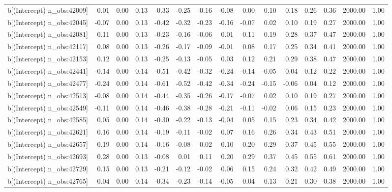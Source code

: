 \begin{table}[ht]
\begin{tabular}{rrrrrrrrrrrrrrr}
  b[(Intercept) n\_obs:42009] & 0.01 & 0.00 & 0.13 & -0.33 & -0.25 & -0.16 & -0.08 & 0.00 & 0.10 & 0.18 & 0.26 & 0.36 & 2000.00 & 1.00 \\ 
  b[(Intercept) n\_obs:42045] & -0.07 & 0.00 & 0.13 & -0.42 & -0.32 & -0.23 & -0.16 & -0.07 & 0.02 & 0.10 & 0.19 & 0.27 & 2000.00 & 1.00 \\ 
  b[(Intercept) n\_obs:42081] & 0.11 & 0.00 & 0.13 & -0.23 & -0.16 & -0.06 & 0.01 & 0.11 & 0.19 & 0.28 & 0.37 & 0.47 & 2000.00 & 1.00 \\ 
  b[(Intercept) n\_obs:42117] & 0.08 & 0.00 & 0.13 & -0.26 & -0.17 & -0.09 & -0.01 & 0.08 & 0.17 & 0.25 & 0.34 & 0.41 & 2000.00 & 1.00 \\ 
  b[(Intercept) n\_obs:42153] & 0.12 & 0.00 & 0.13 & -0.25 & -0.13 & -0.05 & 0.03 & 0.12 & 0.21 & 0.29 & 0.38 & 0.47 & 2000.00 & 1.00 \\ 
  b[(Intercept) n\_obs:42441] & -0.14 & 0.00 & 0.14 & -0.51 & -0.42 & -0.32 & -0.24 & -0.14 & -0.05 & 0.04 & 0.12 & 0.22 & 2000.00 & 1.00 \\ 
  b[(Intercept) n\_obs:42477] & -0.24 & 0.00 & 0.14 & -0.61 & -0.52 & -0.42 & -0.34 & -0.24 & -0.15 & -0.06 & 0.04 & 0.12 & 2000.00 & 1.00 \\ 
  b[(Intercept) n\_obs:42513] & -0.08 & 0.00 & 0.14 & -0.44 & -0.35 & -0.26 & -0.17 & -0.07 & 0.02 & 0.10 & 0.19 & 0.27 & 2000.00 & 1.00 \\ 
  b[(Intercept) n\_obs:42549] & -0.11 & 0.00 & 0.14 & -0.46 & -0.38 & -0.28 & -0.21 & -0.11 & -0.02 & 0.06 & 0.15 & 0.23 & 2000.00 & 1.00 \\ 
  b[(Intercept) n\_obs:42585] & 0.05 & 0.00 & 0.14 & -0.30 & -0.22 & -0.13 & -0.04 & 0.05 & 0.15 & 0.23 & 0.34 & 0.42 & 2000.00 & 1.00 \\ 
  b[(Intercept) n\_obs:42621] & 0.16 & 0.00 & 0.14 & -0.19 & -0.11 & -0.02 & 0.07 & 0.16 & 0.26 & 0.34 & 0.43 & 0.51 & 2000.00 & 1.00 \\ 
  b[(Intercept) n\_obs:42657] & 0.19 & 0.00 & 0.14 & -0.16 & -0.08 & 0.02 & 0.10 & 0.20 & 0.29 & 0.37 & 0.45 & 0.55 & 2000.00 & 1.00 \\ 
  b[(Intercept) n\_obs:42693] & 0.28 & 0.00 & 0.13 & -0.08 & 0.01 & 0.11 & 0.20 & 0.29 & 0.37 & 0.45 & 0.55 & 0.61 & 2000.00 & 1.00 \\ 
  b[(Intercept) n\_obs:42729] & 0.15 & 0.00 & 0.13 & -0.21 & -0.12 & -0.02 & 0.06 & 0.15 & 0.24 & 0.32 & 0.42 & 0.49 & 2000.00 & 1.00 \\ 
  b[(Intercept) n\_obs:42765] & 0.04 & 0.00 & 0.14 & -0.34 & -0.23 & -0.14 & -0.05 & 0.04 & 0.13 & 0.21 & 0.30 & 0.38 & 2000.00 & 1.00 \\ 

\end{tabular}
\end{table}
